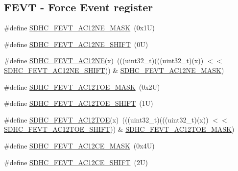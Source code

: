 \subsection*{F\+E\+VT -\/ Force Event register}
\begin{DoxyCompactItemize}
\item 
\#define \mbox{\hyperlink{group___s_d_h_c___register___masks_ga9f03ca4771ba7ba7dd17652cc0b3523f}{S\+D\+H\+C\+\_\+\+F\+E\+V\+T\+\_\+\+A\+C12\+N\+E\+\_\+\+M\+A\+SK}}~(0x1\+U)
\item 
\#define \mbox{\hyperlink{group___s_d_h_c___register___masks_gaaa25d15ca9ece7802c84eaabfcb610a3}{S\+D\+H\+C\+\_\+\+F\+E\+V\+T\+\_\+\+A\+C12\+N\+E\+\_\+\+S\+H\+I\+FT}}~(0\+U)
\item 
\#define \mbox{\hyperlink{group___s_d_h_c___register___masks_ga337a1fca727480f69932379e47c4619f}{S\+D\+H\+C\+\_\+\+F\+E\+V\+T\+\_\+\+A\+C12\+NE}}(x)~(((uint32\+\_\+t)(((uint32\+\_\+t)(x)) $<$$<$ \mbox{\hyperlink{group___s_d_h_c___register___masks_gaaa25d15ca9ece7802c84eaabfcb610a3}{S\+D\+H\+C\+\_\+\+F\+E\+V\+T\+\_\+\+A\+C12\+N\+E\+\_\+\+S\+H\+I\+FT}})) \& \mbox{\hyperlink{group___s_d_h_c___register___masks_ga9f03ca4771ba7ba7dd17652cc0b3523f}{S\+D\+H\+C\+\_\+\+F\+E\+V\+T\+\_\+\+A\+C12\+N\+E\+\_\+\+M\+A\+SK}})
\item 
\#define \mbox{\hyperlink{group___s_d_h_c___register___masks_ga08461177de9d00d32471a042648a0d67}{S\+D\+H\+C\+\_\+\+F\+E\+V\+T\+\_\+\+A\+C12\+T\+O\+E\+\_\+\+M\+A\+SK}}~(0x2\+U)
\item 
\#define \mbox{\hyperlink{group___s_d_h_c___register___masks_ga655231f1f3f9422f32cf26cfdb56b7d2}{S\+D\+H\+C\+\_\+\+F\+E\+V\+T\+\_\+\+A\+C12\+T\+O\+E\+\_\+\+S\+H\+I\+FT}}~(1\+U)
\item 
\#define \mbox{\hyperlink{group___s_d_h_c___register___masks_ga6f5c7741b2f4c306190f9898990b0a11}{S\+D\+H\+C\+\_\+\+F\+E\+V\+T\+\_\+\+A\+C12\+T\+OE}}(x)~(((uint32\+\_\+t)(((uint32\+\_\+t)(x)) $<$$<$ \mbox{\hyperlink{group___s_d_h_c___register___masks_ga655231f1f3f9422f32cf26cfdb56b7d2}{S\+D\+H\+C\+\_\+\+F\+E\+V\+T\+\_\+\+A\+C12\+T\+O\+E\+\_\+\+S\+H\+I\+FT}})) \& \mbox{\hyperlink{group___s_d_h_c___register___masks_ga08461177de9d00d32471a042648a0d67}{S\+D\+H\+C\+\_\+\+F\+E\+V\+T\+\_\+\+A\+C12\+T\+O\+E\+\_\+\+M\+A\+SK}})
\item 
\#define \mbox{\hyperlink{group___s_d_h_c___register___masks_gabbde9b3a4bf7a5ba098a8793459a93e3}{S\+D\+H\+C\+\_\+\+F\+E\+V\+T\+\_\+\+A\+C12\+C\+E\+\_\+\+M\+A\+SK}}~(0x4\+U)
\item 
\#define \mbox{\hyperlink{group___s_d_h_c___register___masks_ga6765ca9b4ffb1bf49aa914593c6d6476}{S\+D\+H\+C\+\_\+\+F\+E\+V\+T\+\_\+\+A\+C12\+C\+E\+\_\+\+S\+H\+I\+FT}}~(2\+U)

\end{DoxyCompactItemize}
